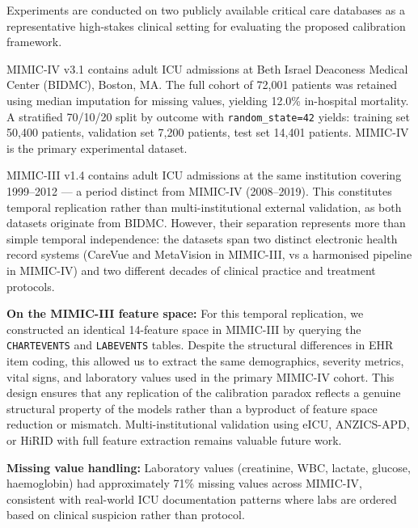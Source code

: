 \documentclass{ieeeaccess}
\begin{document}
Experiments are conducted on two publicly available critical care databases as a representative high-stakes clinical setting for evaluating the proposed calibration framework.

MIMIC-IV v3.1 \cite{b18} contains adult ICU admissions at Beth Israel Deaconess Medical Center (BIDMC), Boston, MA. The full cohort of 72,001 patients was retained using median imputation for missing values, yielding 12.0\% in-hospital mortality. A stratified 70/10/20 split by outcome with \texttt{random\_state=42} yields: training set 50,400 patients, validation set 7,200 patients, test set 14,401 patients. MIMIC-IV is the primary experimental dataset.

MIMIC-III v1.4 \cite{b19} contains adult ICU admissions at the same institution covering 1999--2012 — a period distinct from MIMIC-IV (2008--2019). This constitutes temporal replication rather than multi-institutional external validation, as both datasets originate from BIDMC. However, their separation represents more than simple temporal independence: the datasets span two distinct electronic health record systems (CareVue and MetaVision in MIMIC-III, vs a harmonised pipeline in MIMIC-IV) and two different decades of clinical practice and treatment protocols. 

\textbf{On the MIMIC-III feature space:} For this temporal replication, we constructed an identical 14-feature space in MIMIC-III by querying the \texttt{CHARTEVENTS} and \texttt{LABEVENTS} tables. Despite the structural differences in EHR item coding, this allowed us to extract the same demographics, severity metrics, vital signs, and laboratory values used in the primary MIMIC-IV cohort. This design ensures that any replication of the calibration paradox reflects a genuine structural property of the models rather than a byproduct of feature space reduction or mismatch. Multi-institutional validation using eICU, ANZICS-APD, or HiRID with full feature extraction remains valuable future work.

\textbf{Missing value handling:} Laboratory values (creatinine, WBC, lactate, glucose, haemoglobin) had approximately 71\% missing values across MIMIC-IV, consistent with real-world ICU documentation patterns where labs are ordered based on clinical suspicion rather than protocol.
\end{document}
